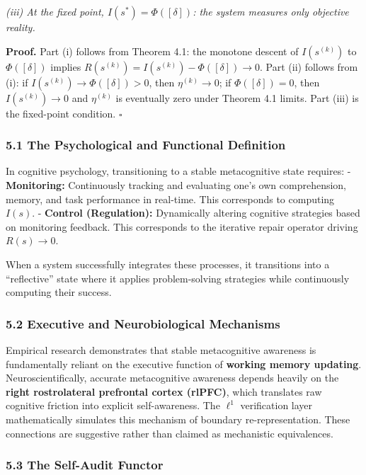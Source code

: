 \documentclass[
]{article}
\begin{document}
\emph{(iii) At the fixed point, \(I(s^*) = \Phi([\delta])\): the system
measures only objective reality.}

\textbf{Proof.} Part (i) follows from Theorem 4.1: the monotone descent
of \(I(s^{(k)})\) to \(\Phi([\delta])\) implies
\(R(s^{(k)}) = I(s^{(k)}) - \Phi([\delta]) \to 0\). Part (ii) follows
from (i): if \(I(s^{(k)}) \to \Phi([\delta]) > 0\), then
\(\eta^{(k)} \to 0\); if \(\Phi([\delta]) = 0\), then
\(I(s^{(k)}) \to 0\) and \(\eta^{(k)}\) is eventually zero under Theorem
4.1 limits. Part (iii) is the fixed-point condition. \(\square\)

\subsubsection{5.1 The Psychological and Functional
Definition}\label{the-psychological-and-functional-definition}

In cognitive psychology, transitioning to a stable metacognitive state
requires: - \textbf{Monitoring:} Continuously tracking and evaluating
one's own comprehension, memory, and task performance in real-time. This
corresponds to computing \(I(s)\). - \textbf{Control (Regulation):}
Dynamically altering cognitive strategies based on monitoring feedback.
This corresponds to the iterative repair operator driving
\(R(s) \to 0\).

When a system successfully integrates these processes, it transitions
into a ``reflective'' state where it applies problem-solving strategies
while continuously computing their success.

\subsubsection{5.2 Executive and Neurobiological
Mechanisms}\label{executive-and-neurobiological-mechanisms}

Empirical research demonstrates that stable metacognitive awareness is
fundamentally reliant on the executive function of \textbf{working
memory updating}. Neuroscientifically, accurate metacognitive awareness
depends heavily on the \textbf{right rostrolateral prefrontal cortex
(rlPFC)}, which translates raw cognitive friction into explicit
self-awareness. The \(\ell^1\) verification layer mathematically
simulates this mechanism of boundary re-representation. These
connections are suggestive rather than claimed as mechanistic
equivalences.

\subsubsection{5.3 The Self-Audit Functor}\label{the-self-audit-functor}
\end{document}
